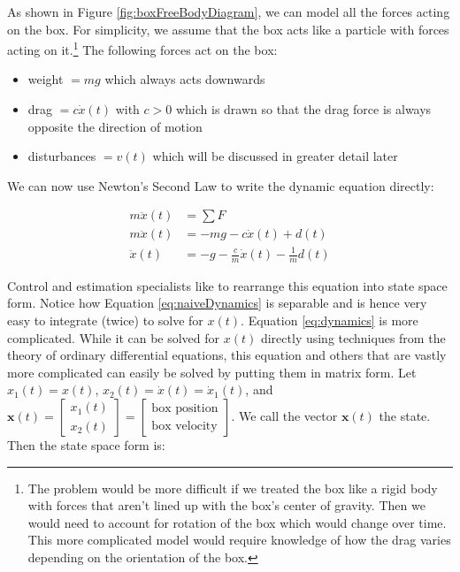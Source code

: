 \documentclass{article}
\begin{document}
As shown in Figure \ref{fig:boxFreeBodyDiagram}, we can model all the forces acting on the box.  For simplicity, we assume that the box acts like a particle with forces acting on it.\footnote{The problem would be more difficult if we treated the box like a rigid body with forces that aren't lined up with the box's center of gravity.  Then we would need to account for rotation of the box which would change over time.  This more complicated model would require knowledge of how the drag varies depending on the orientation of the box.  }  The following forces act on the box:
\begin{itemize}
\item weight $=mg$ which always acts downwards
\item drag $=c\dot{x}(t)$ with $c>0$ which is drawn so that the drag force is always opposite the direction of motion
\item disturbances $=v(t)$ which will be discussed in greater detail later 
\end{itemize}
We can now use Newton's Second Law to write the dynamic equation directly:

\begin{align}
\label{eq:dynamics}
m\ddot{x}(t) &= \sum F \nonumber \\
m\ddot{x}(t) &= -mg-c\dot{x}(t)+d(t)\nonumber\\
\ddot{x}(t) &= -g-\frac{c}{m}\dot{x}(t)-\frac{1}{m}d(t)
\end{align}

Control and estimation specialists like to rearrange this equation into state space form.  Notice how Equation \ref{eq:naiveDynamics} is separable and is hence very easy to integrate (twice) to solve for $x(t)$.  Equation \ref{eq:dynamics} is more complicated.  While it can be solved for $x(t)$ directly using techniques from the theory of ordinary differential equations, this equation and others that are vastly more complicated can easily be solved by putting them in matrix form.  Let $x_1(t)=x(t)$, $x_2(t)=\dot{x}(t)=\dot{x}_1(t)$, and $\pmb{x}(t)=\begin{bmatrix} x_1(t) \\ x_2(t) \end{bmatrix}=\begin{bmatrix}\textrm{box position}\\\textrm{box velocity}\end{bmatrix}$.  We call the vector $\pmb{x}(t)$ the state.  Then the state space form is:
\end{document}
